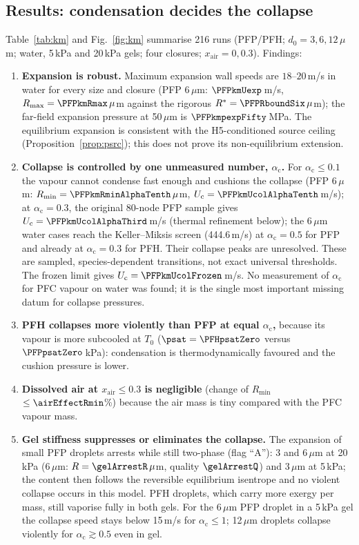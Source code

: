 \subsection{Results: condensation decides the collapse}\label{sec:km_results}
Table~\ref{tab:km} and Fig.~\ref{fig:km} summarise 216 runs (PFP/PFH; $d_0=3,6,12\,\mu$m; water,
5\,kPa and 20\,kPa gels; four closures; $x_{\mathrm{air}}=0,0.3$). Findings:
\begin{enumerate}[leftmargin=*]
\item \textbf{Expansion is robust.} Maximum expansion wall speeds are $18$--$20$\,m/s in water for
every size and closure (PFP 6\,$\mu$m: $\PFPkmUexp$\,m/s, $R_{\max}=\PFPkmRmax\,\mu$m against the
rigorous $R^*=\PFPRboundSix\,\mu$m); the far-field expansion pressure at 50\,$\mu$m is
$\PFPkmpexpFifty$\,MPa. The equilibrium expansion is consistent with the H5-conditioned source
ceiling (Proposition~\ref{prop:psrc}); this does not prove its non-equilibrium extension.
\item \textbf{Collapse is controlled by one unmeasured number, $\alpha_{\mathrm c}$.} For
$\alpha_{\mathrm c}\le0.1$ the vapour cannot condense fast enough and cushions the collapse
(PFP 6\,$\mu$m: $R_{\min}=\PFPkmRminAlphaTenth\,\mu$m, $U_{\mathrm c}=\PFPkmUcolAlphaTenth$\,m/s);
at $\alpha_{\mathrm c}=0.3$, the original 80-node PFP sample gives
$U_{\mathrm c}=\PFPkmUcolAlphaThird$\,m/s (thermal refinement below); the 6\,$\mu$m water cases reach
the Keller--Miksis screen (444.6\,m/s) at $\alpha_{\mathrm c}=0.5$ for PFP and already at
$\alpha_{\mathrm c}=0.3$ for PFH. Their collapse peaks are unresolved. These are sampled,
species-dependent transitions, not exact universal thresholds. The
frozen limit gives $U_{\mathrm c}=\PFPkmUcolFrozen$\,m/s. No measurement of $\alpha_{\mathrm c}$ for PFC
vapour on water was found; it is the single most important missing datum for collapse pressures.
\item \textbf{PFH collapses more violently than PFP at equal $\alpha_{\mathrm c}$,} because its vapour
is more subcooled at $T_0$ ($\psat=\PFHpsatZero$ versus $\PFPpsatZero$\,kPa): condensation
is thermodynamically favoured and the cushion pressure is lower.
\item \textbf{Dissolved air at $x_{\mathrm{air}}\le0.3$ is negligible} (change of $R_{\min}$ $\le\airEffectRmin$\%)
because the air mass is tiny compared with the PFC vapour mass.
\item \textbf{Gel stiffness suppresses or eliminates the collapse.} The expansion of small PFP droplets
arrests while still two-phase (flag ``A''): 3 and 6\,$\mu$m at 20\,kPa (6\,$\mu$m: $R=\gelArrestR\,\mu$m, quality
$\gelArrestQ$) and 3\,$\mu$m at 5\,kPa; the content then follows the reversible equilibrium isentrope and no violent
collapse occurs in this model. PFH droplets, which carry more exergy per mass, still vaporise fully in both gels.
For the 6\,$\mu$m PFP droplet in a 5\,kPa gel the collapse speed stays below 15\,m/s for $\alpha_{\mathrm c}\le1$;
12\,$\mu$m droplets collapse violently for $\alpha_{\mathrm c}\gtrsim0.5$ even in gel.
\end{enumerate}
